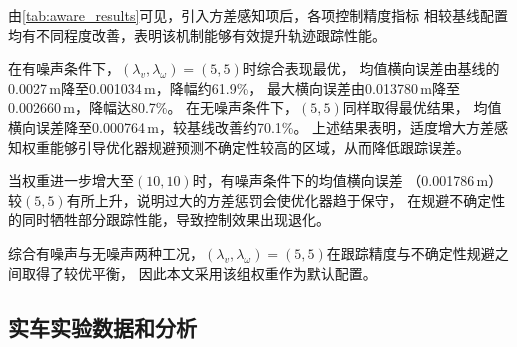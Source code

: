 \begin{table}[htbp]
\centering
\caption{方差感知权重消融实验结果（通信延迟工况，一阶GP-MPC）}
\label{tab:aware_results}
\end{table}

由\autoref{tab:aware_results}可见，引入方差感知项后，各项控制精度指标
相较基线配置均有不同程度改善，表明该机制能够有效提升轨迹跟踪性能。

在有噪声条件下，$(\lambda_v, \lambda_\omega)=(5,5)$时综合表现最优，
均值横向误差由基线的0.0027\,m降至0.001034\,m，降幅约61.9\%，
最大横向误差由0.013780\,m降至0.002660\,m，降幅达80.7\%。
在无噪声条件下，$(5,5)$同样取得最优结果，
均值横向误差降至0.000764\,m，较基线改善约70.1\%。
上述结果表明，适度增大方差感知权重能够引导优化器规避预测不确定性较高的区域，从而降低跟踪误差。

当权重进一步增大至$(10,10)$时，有噪声条件下的均值横向误差
（0.001786\,m）较$(5,5)$有所上升，说明过大的方差惩罚会使优化器趋于保守，
在规避不确定性的同时牺牲部分跟踪性能，导致控制效果出现退化。

综合有噪声与无噪声两种工况，$(\lambda_v, \lambda_\omega)=(5,5)$在跟踪精度与不确定性规避之间取得了较优平衡，
因此本文采用该组权重作为默认配置。

\subsection{实车实验数据和分析}
\label{subsec:real_world_exp}
 
